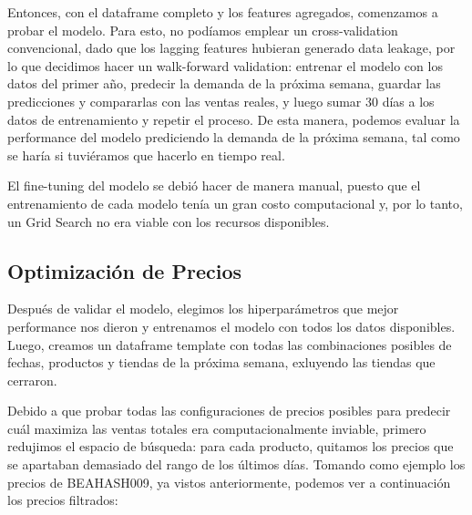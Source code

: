 \documentclass[12pt,a4paper]{article}
\begin{document}
\vspace{0.2cm}

Entonces, con el dataframe completo y los features agregados, comenzamos a probar el modelo. Para esto, no podíamos emplear un cross-validation 
convencional, dado que los lagging features hubieran generado data leakage, por lo que decidimos hacer un walk-forward validation: 
entrenar el modelo con los datos del primer año, predecir la demanda de la próxima semana, guardar las predicciones y compararlas con 
las ventas reales, y luego sumar 30 días a los datos de entrenamiento y repetir el proceso. De esta manera, podemos evaluar la performance del 
modelo prediciendo la demanda de la próxima semana, tal como se haría si tuviéramos que hacerlo en tiempo real.

\vspace{0.2cm}

El fine-tuning del modelo se debió hacer de manera manual, puesto que el entrenamiento de cada modelo tenía un gran costo computacional 
y, por lo tanto, un Grid Search no era viable con los recursos disponibles.



\subsection{Optimización de Precios}

Después de validar el modelo, elegimos los hiperparámetros que mejor performance nos dieron y entrenamos el modelo con todos los datos 
disponibles. Luego, creamos un dataframe template con todas las combinaciones posibles de fechas, productos y tiendas de la próxima semana, 
exluyendo las tiendas que cerraron. 

\vspace{0.2cm}

Debido a que probar todas las configuraciones de precios posibles para predecir cuál maximiza las ventas totales era computacionalmente inviable, primero 
redujimos el espacio de búsqueda: para cada producto, quitamos los precios que se apartaban demasiado del rango de los últimos días. Tomando como ejemplo 
los precios de BEAHASH009, ya vistos anteriormente, podemos ver a continuación los precios filtrados:

\begin{center}
\end{center}
\end{document}
